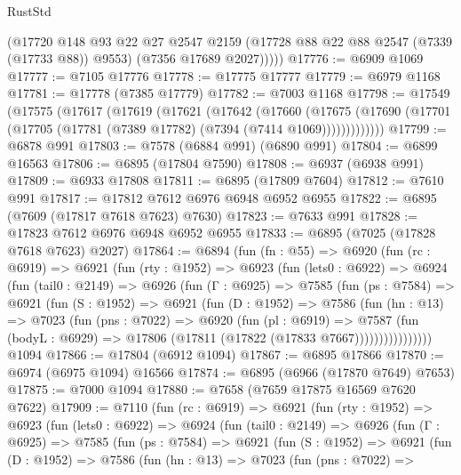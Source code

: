 \begin{lexlean}{RustStd}
\begin{coremodule}
          (@17720
            @148
            @93
            @22
            @27
            @2547
            @2159
            (@17728 @88 @22 @88 @2547 (@7339 (@17733 @88)) @9553)
            (@7356 @17689 @2027)))))
@17776 := @6909 @1069
@17777 := @7105 @17776
@17778 := @17775 @17777
@17779 := @6979 @1168
@17781 := @17778 (@7385 @17779)
@17782 := @7003 @1168
@17798 := @17549
    (@17575
      (@17617
        (@17619
          (@17621
            (@17642
              (@17660
                (@17675
                  (@17690 (@17701 (@17705 (@17781 (@7389 @17782) (@7394 (@7414 @1069)))))))))))))
@17799 := @6878 @991
@17803 := @7578 (@6884 @991) (@6890 @991)
@17804 := @6899 @16563
@17806 := @6895 (@17804 @7590)
@17808 := @6937 (@6938 @991)
@17809 := @6933 @17808
@17811 := @6895 (@17809 @7604)
@17812 := @7610 @991
@17817 := @17812 @7612 @6976 @6948 @6952 @6955
@17822 := @6895 (@7609 (@17817 @7618 @7623) @7630)
@17823 := @7633 @991
@17828 := @17823 @7612 @6976 @6948 @6952 @6955
@17833 := @6895 (@7025 (@17828 @7618 @7623) @2027)
@17864 := @6894
    (fun (fn : @55) =>
    @6920
      (fun (rc : @6919) =>
      @6921
        (fun (rty : @1952) =>
        @6923
          (fun (lets0 : @6922) =>
          @6924
            (fun (tail0 : @2149) =>
            @6926
              (fun (Γ : @6925) =>
              @7585
                (fun (ps : @7584) =>
                @6921
                  (fun (S : @1952) =>
                  @6921
                    (fun (D : @1952) =>
                    @7586
                      (fun (hn : @13) =>
                      @7023
                        (fun (pns : @7022) =>
                        @6920
                          (fun (pl : @6919) =>
                          @7587
                            (fun (bodyL : @6929) =>
                            @17806 (@17811 (@17822 (@17833 @7667))))))))))))))))
    @1094
@17866 := @17804 (@6912 @1094)
@17867 := @6895 @17866
@17870 := @6974 (@6975 @1094) @16566
@17874 := @6895 (@6966 (@17870 @7649) @7653)
@17875 := @7000 @1094
@17880 := @7658 (@7659 @17875 @16569 @7620 @7622)
@17909 := @7110
    (fun (rc : @6919) =>
    @6921
      (fun (rty : @1952) =>
      @6923
        (fun (lets0 : @6922) =>
        @6924
          (fun (tail0 : @2149) =>
          @6926
            (fun (Γ : @6925) =>
            @7585
              (fun (ps : @7584) =>
              @6921
                (fun (S : @1952) =>
                @6921
                  (fun (D : @1952) =>
                  @7586
                    (fun (hn : @13) =>
                    @7023
                      (fun (pns : @7022) =>

\end{coremodule}
\end{lexlean}
